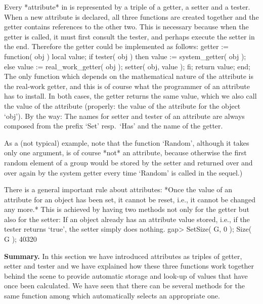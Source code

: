 Every *attribute* in  {\GAP} is represented by  a triple  of a getter,  a
setter   and a  tester.  When a  new  attribute  is  declared, all  three
functions are created together and  the getter contains references to the
other two.  This is necessary because when  the getter is called, it must
first  consult the tester,   and perhaps execute the  setter  in the end.
Therefore the getter could be implemented as follows:
\begintt
getter := function( obj )
local   value;
    if tester( obj )  then
        value := system_getter( obj );
    else
        value := real_work_getter( obj );
        setter( obj, value );
    fi;
    return value;
end;
\endtt
The  only  function which  depends on   the  mathematical  nature  of the
attribute  is  the  real-work getter,  and this   is  of course  what the
programmer of  an  attribute has to  install.  In both cases,  the getter
returns  the same value, which  we also call  the  value of the attribute
(properly: the value of the attribute for the object `obj').
By the way:
The names for setter and tester of an attribute are always composed from
the prefix `Set' resp.~`Has' and the name of the getter.

As a (not typical) example, note that the {\GAP} function `Random',
although it takes only one argument, is of course *not* an attribute,
because otherwise the first random element of a group would be stored by
the setter and returned over and over again by the system getter
every time `Random' is called in the sequel.)

There is a general important rule about attributes: *Once the value of an
attribute for an object has been set, it cannot be reset, i.e., it cannot
be changed any more.* This is achieved by having two methods not only for
the getter but also for the setter: If an object already has an attribute
value stored, i.e., if the tester  returns `true', the setter simply does
nothing.
\beginexample
gap> SetSize( G, 0 ); Size( G );
40320
\endexample

%

{\bf  Summary.} In this section  we have introduced attributes as triples
of getter, setter   and tester and    we have explained how  these  three
functions work together behind  the  scene to provide automatic  storage
and look-up of  values that have once been  calculated. We have seen that
there can be several methods for  the   same function  among which {\GAP}
automatically selects an appropriate one.

